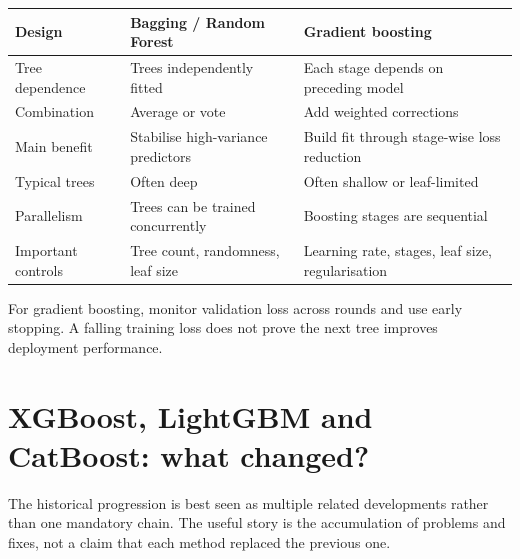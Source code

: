 \begin{center}\small
\begin{tabularx}{\linewidth}{@{}L{.25\linewidth}YY@{}}\toprule
Design & Bagging / Random Forest & Gradient boosting\\\midrule
Tree dependence & Trees independently fitted & Each stage depends on preceding model\\
Combination & Average or vote & Add weighted corrections\\
Main benefit & Stabilise high-variance predictors & Build fit through stage-wise loss reduction\\
Typical trees & Often deep & Often shallow or leaf-limited\\
Parallelism & Trees can be trained concurrently & Boosting stages are sequential\\
Important controls & Tree count, randomness, leaf size & Learning rate, stages, leaf size, regularisation\\\bottomrule
\end{tabularx}
\end{center}

\begin{calloutpractical}
For gradient boosting, monitor validation loss across rounds and use early stopping.
A falling training loss does not prove the next tree improves deployment performance.
\end{calloutpractical}

\section{XGBoost, LightGBM and CatBoost: what changed?}
\label{sec:trees-xgboost-lightgbm-and-catboost-what-changed}
The historical progression is best seen as multiple related developments rather than one mandatory chain.
The useful story is the accumulation of problems and fixes, not a claim that each method replaced the previous one.

